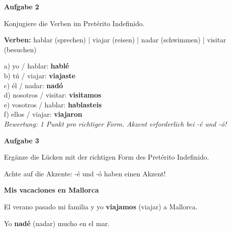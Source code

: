 \documentclass[11pt, a4paper]{article}
\newcommand{\fachfarbe}{spanisch}
\newcommand{\punktebox}[1]{\hfill\fbox{\small \_/#1}}
\newcommand{\loesung}[1]{\textcolor{loesung}{\textbf{#1}}}
\newenvironment{aufgabe}[1]{%
    \needspace{5\baselineskip}%
    \nopagebreak[4]%
    \vspace{10pt}
    \noindent\textbf{\textcolor{\fachfarbe}{Aufgabe #1}}
    \nopagebreak[4]%
    \vspace{5pt}
    \nopagebreak[4]%
    \begin{list}{}{\leftmargin=0pt}
    \item[]
}{%
    \end{list}
}
\begin{document}
\begin{aufgabe}{2}
Konjugiere die Verben im Pretérito Indefinido. \punktebox{6}
\end{aufgabe}

\begin{vokabelkasten}
\textbf{Verben:} hablar (sprechen) | viajar (reisen) | nadar (schwimmen) | visitar (besuchen)
\end{vokabelkasten}

\vspace{0.5em}

\noindent
a) yo / hablar: \loesung{hablé} \\[0.8em]
b) tú / viajar: \loesung{viajaste} \\[0.8em]
c) él / nadar: \loesung{nadó} \\[0.8em]
d) nosotros / visitar: \loesung{visitamos} \\[0.8em]
e) vosotros / hablar: \loesung{hablasteis} \\[0.8em]
f) ellos / viajar: \loesung{viajaron} \\

\textit{\textcolor{grau}{Bewertung: 1 Punkt pro richtiger Form. Akzent erforderlich bei -é und -ó!}}

\vspace{15pt}


\begin{aufgabe}{3}
Ergänze die Lücken mit der richtigen Form des Pretérito Indefinido. \punktebox{6}
\end{aufgabe}

\begin{hinweis}
Achte auf die Akzente: -é und -ó haben einen Akzent!
\end{hinweis}

\vspace{0.5em}

\noindent
\textbf{Mis vacaciones en Mallorca}

\vspace{0.5em}

\noindent
El verano pasado mi familia y yo \loesung{viajamos} (viajar) a Mallorca.

\vspace{0.5em}

\noindent
Yo \loesung{nadé} (nadar) mucho en el mar.
\end{document}
